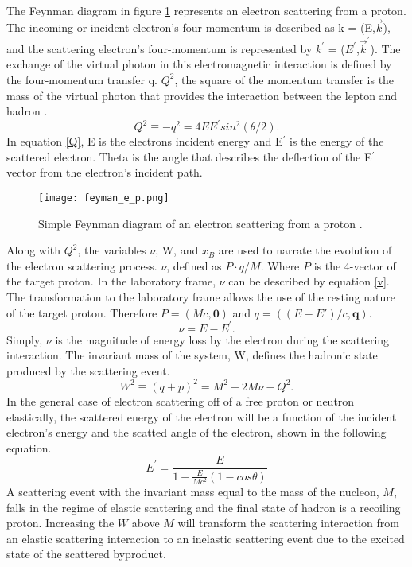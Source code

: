 \paragraph{} The Feynman diagram in figure \ref{feynman} represents an electron scattering from a proton. The incoming or incident electron's four-momentum is described as k = (E,$ \vec{k}$), and the scattering electron's four-momentum is represented by $k^\prime{}$ = ($E^\prime{}$,$\vec{k}^\prime{}$). The exchange of the virtual photon in this electromagnetic interaction is defined by the four-momentum transfer q. $Q^2$, the square of the momentum transfer is the mass of the virtual photon that provides the interaction between the lepton and hadron \cite{sane}. 
\begin{equation}
\label{Q}
Q^2 \equiv -q^2 = 4EE^\prime{} sin^2(\theta/2).
\end{equation} 
In equation \ref{Q}, E is the electrons incident energy and E$^\prime$ is the energy of the scattered electron. Theta is the angle that describes the deflection of the E$^\prime$ vector from the electron's incident path. 
\begin{figure}[t]
\centering
\caption{Simple Feynman diagram of an electron scattering from a proton \cite{Flay}.}
\texttt{[image: feyman\_e\_p.png]}
\label{feynman}
\end{figure}
Along with $Q^2$, the variables $\nu$, W, and $x_B$  are used to narrate the evolution of the electron scattering process. $\nu$, defined as $P\cdot q/M$. Where $P$ is the 4-vector of the target proton. In the laboratory frame, $\nu$ can be described by equation \ref{v}. The transformation to the laboratory frame allows the use of the resting nature of the target proton. Therefore $P = (Mc,\boldsymbol{0})$ and $ q = (( E-E\prime)/c,\boldsymbol{q})$. 
\begin{equation}
\label{v}
\nu = E - E^\prime{}.
\end{equation}
Simply, $\nu$ is the magnitude of energy loss by the electron during the scattering interaction. The invariant mass of the system, W,  defines the hadronic state produced by the scattering event. 
\begin{equation}
\label{W}
W^2 \equiv (q + p)^2 = M^2 + 2M\nu -Q^2.
\end{equation}
In the general case of electron scattering off of a free proton or neutron elastically, the scattered energy of the electron will be a function of the incident electron's energy and the scatted angle of the electron, shown in the following equation.
\begin{equation}
E^\prime =\frac{E}{1+\frac{E}{Mc^2}(1-cos\theta)}
\end{equation}
A scattering event with the invariant mass equal to the mass of the nucleon, $M$, falls in the regime of elastic scattering and the final state of hadron is a recoiling proton. Increasing the $W$ above $M$ will transform the scattering interaction from an elastic scattering interaction to an inelastic scattering event due to the excited state of the scattered byproduct. 
